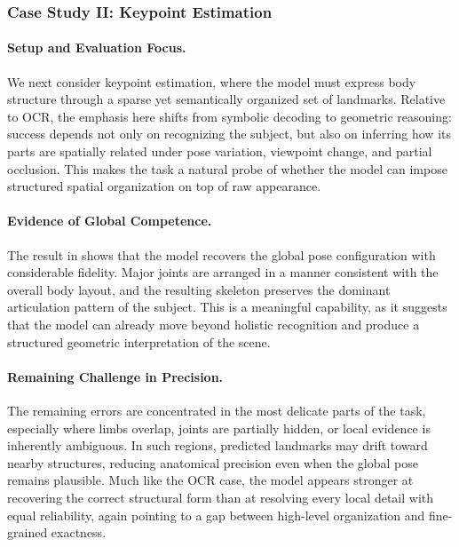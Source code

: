 \documentclass{llmxive}
\begin{document}
\subsubsection{Case Study II: Keypoint Estimation}

\paragraph{Setup and Evaluation Focus.}
We next consider keypoint estimation, where the model must express body structure through a sparse yet semantically organized set of landmarks. Relative to OCR, the emphasis here shifts from symbolic decoding to geometric reasoning: success depends not only on recognizing the subject, but also on inferring how its parts are spatially related under pose variation, viewpoint change, and partial occlusion. This makes the task a natural probe of whether the model can impose structured spatial organization on top of raw appearance.

\paragraph{Evidence of Global Competence.}
The result in  shows that the model recovers the global pose configuration with considerable fidelity. Major joints are arranged in a manner consistent with the overall body layout, and the resulting skeleton preserves the dominant articulation pattern of the subject. This is a meaningful capability, as it suggests that the model can already move beyond holistic recognition and produce a structured geometric interpretation of the scene.

\paragraph{Remaining Challenge in Precision.}
The remaining errors are concentrated in the most delicate parts of the task, especially where limbs overlap, joints are partially hidden, or local evidence is inherently ambiguous. In such regions, predicted landmarks may drift toward nearby structures, reducing anatomical precision even when the global pose remains plausible. Much like the OCR case, the model appears stronger at recovering the correct structural form than at resolving every local detail with equal reliability, again pointing to a gap between high-level organization and fine-grained exactness.
\end{document}
